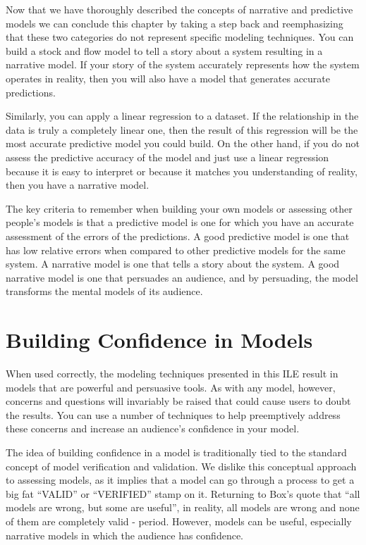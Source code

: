 \documentclass[]{memoir}
\begin{document}
Now that we have thoroughly described the concepts of narrative and
predictive models we can conclude this chapter by taking a step back and
reemphasizing that these two categories do not represent specific
modeling techniques. You can build a stock and flow model to tell a
story about a system resulting in a narrative model. If your story of
the system accurately represents how the system operates in reality,
then you will also have a model that generates accurate predictions.

Similarly, you can apply a linear regression to a dataset. If the
relationship in the data is truly a completely linear one, then the
result of this regression will be the most accurate predictive model you
could build. On the other hand, if you do not assess the predictive
accuracy of the model and just use a linear regression because it is
easy to interpret or because it matches you understanding of reality,
then you have a narrative model.

The key criteria to remember when building your own models or assessing
other people's models is that a predictive model is one for which you
have an accurate assessment of the errors of the predictions. A good
predictive model is one that has low relative errors when compared to
other predictive models for the same system. A narrative model is one
that tells a story about the system. A good narrative model is one that
persuades an audience, and by persuading, the model transforms the
mental models of its audience.

\chapter{Building Confidence in Models}

When used correctly, the modeling techniques presented in this ILE
result in models that are powerful and persuasive tools. As with any
model, however, concerns and questions will invariably be raised that
could cause users to doubt the results. You can use a number of
techniques to help preemptively address these concerns and increase an
audience's confidence in your model.

The idea of building confidence in a model is traditionally tied to the
standard concept of model verification and validation. We dislike this
conceptual approach to assessing models, as it implies that a model can
go through a process to get a big fat ``VALID'' or ``VERIFIED'' stamp on
it. Returning to Box's quote that ``all models are wrong, but some are
useful'', in reality, all models are wrong and none of them are
completely valid - period. However, models can be useful, especially
narrative models in which the audience has confidence.
\end{document}
